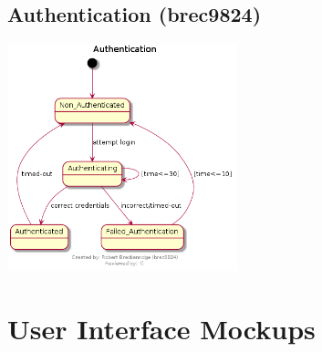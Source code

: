 \documentclass[11pt]{report}
\begin{document}
    \section{Authentication (brec9824)}
        \begin{minipage}{1\textwidth}
            \begin{center}
                \includegraphics[width=0.5\textwidth]{diagrams/statechart-authentication-brec9824}
            \end{center}
        \end{minipage}


\chapter{User Interface Mockups}
\end{document}
